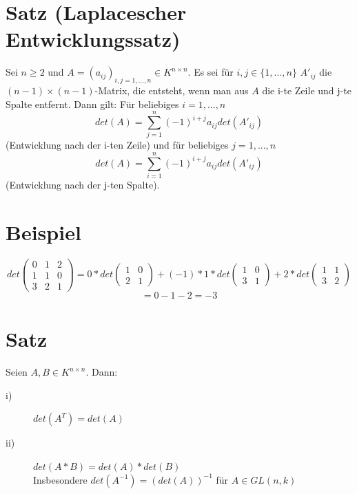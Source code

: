 \documentclass{scrbook}
\begin{document}
\section{Satz (Laplacescher Entwicklungssatz)}
Sei $n\geq 2$ und $A = (a_{ij})_{i,j=1,...,n}\in K^{n \times n}$. Es sei für $i,j \in \{1,...,n\}$ $A'_{ij}$ die $(n-1)\times (n-1)$-Matrix, die entsteht, wenn man aus $A$ die i-te Zeile und j-te Spalte entfernt. Dann gilt: Für beliebiges $i=1,...,n$\[det(A) = \sum^n_{j=1}(-1)^{i+j}a_{ij} det(A'_{ij})\](Entwicklung nach der i-ten Zeile) und für beliebiges $j=1,...,n$
\[det(A) = \sum^n_{i=1}(-1)^{i+j} a_{ij} det(A'_{ij})\](Entwicklung nach der j-ten Spalte).
\section{Beispiel}
\[det\left(
\begin{array}{ccc}
0&1&2\\
1&1&0\\
3&2&1
\end{array}
\right)= 0* det\left(
\begin{array}{cc}
1&0\\2&1
\end{array}
\right)+(-1)*1*det\left(
\begin{array}{cc}
1&0\\3&1
\end{array}
\right)+2*det\left(
\begin{array}{cc}
1&1\\
3&2
\end{array}
\right)\]
\[=0-1-2=-3\]
\section{Satz}
Seien $A,B \in K^{n \times n}$. Dann:
\begin{description}
\item[i)] $det(A^T)=det(A)$
\item[ii)] $det(A*B) = det(A)*det(B)$\\
Insbesondere $det(A^{-1}) = (det(A))^{-1}$ für $A\in GL(n,k)$
\end{description}
\end{document}
